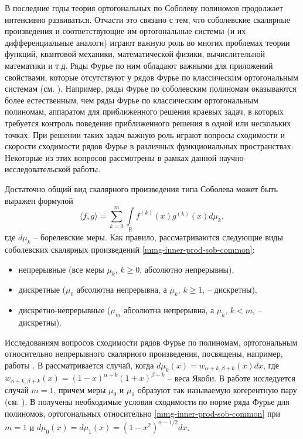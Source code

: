 \Introduction

В последние годы теория ортогональных по Соболеву полиномов продолжает интенсивно развиваться. Отчасти это связано с тем, что соболевские скалярные произведения и соответствующие им ортогональные системы (и их дифференциальные аналоги) играют важную роль во многих проблемах теории функций, квантовой механики, математической физики, вычислительной математики и т.д. Ряды Фурье по ним обладают важными для приложений свойствами, которые отсутствуют у рядов Фурье по классическим ортогональным системам (см. \cite{Ram-Ba-Ra-Pe, Ram-Mar-Xu, mmg-SharapudinovUMN}).
Например, ряды Фурье по соболевским полиномам оказываются более естественным, чем ряды Фурье по классическим ортогональным полиномам, аппаратом для приближенного решения краевых задач, в которых требуется контроль поведения приближенного решения в одной или нескольких точках.
При решении таких задач важную роль играют вопросы сходимости и скорости сходимости рядов Фурье в различных функциональных пространствах. Некоторые из этих вопросов рассмотрены в рамках данной научно-исследовательской работы.

Достаточно общий вид скалярного произведения типа Соболева может быть выражен формулой
\begin{equation}\label{mmg-inner-prod-sob-common}
	\langle f,g \rangle = \sum_{k=0}^{m}\int\limits_{\mathbb{R}}f^{(k)}(x)g^{(k)}(x)d\mu_k,
\end{equation}
где $d\mu_k$ -- борелевские меры.
Как правило, рассматриваются следующие виды соболевских скалярных произведений \eqref{mmg-inner-prod-sob-common}:
\begin{itemize}
	\item
	непрерывные (все меры $\mu_k$, $k \ge 0$, абсолютно непрерывны),
	\item
	дискретные ($\mu_0$ абсолютна непрерывна, а $\mu_k$, $k \ge 1$, -- дискретны),
	\item
	дискретно-непрерывные ($\mu_m$ абсолютна непрерывна, а $\mu_k$, $k < m$, -- дискретны).	
\end{itemize}

Исследованиям вопросов сходимости рядов Фурье по полиномам, ортогональным относительно непрерывного скалярного произведения, посвящены, например, работы \cite{mmg-MarcellanJacobiSobolev, mmg-CiaurriJacobiSobolev, mmg-CiaurriCoherentPairs, mmg-Fejzullahu2010, mmg-Fejzullahu2013}. В \cite{mmg-MarcellanJacobiSobolev, mmg-CiaurriJacobiSobolev} рассматривается случай, когда $d\mu_k(x)=w_{\alpha+k,\beta+k}(x)dx$, где $w_{\alpha+k,\beta+k}(x)=(1-x)^{\alpha+k}(1+x)^{\beta+k}$ -- веса Якоби. В работе \cite{mmg-CiaurriCoherentPairs} исследуется случай $m=1$, причем меры $\mu_0$ и $\mu_1$ образуют так называемую когерентную пару (см. \cite{mmg-IserlesKoch1991, mmg-MarcellanXu2015}). В \cite{mmg-Fejzullahu2010} получены необходимые условия сходимости по норме ряда Фурье для полиномов, ортогональных относительно \eqref{mmg-inner-prod-sob-common} при $m=1$ и $d\mu_0(x)=d\mu_1(x)=(1-x^2)^{\alpha-1/2}dx$.

